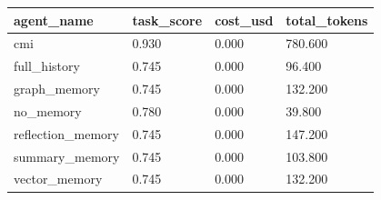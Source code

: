 \begin{tabular}{llll}
\toprule
agent\_name & task\_score & cost\_usd & total\_tokens \\
\midrule
cmi & 0.930 & 0.000 & 780.600 \\
full\_history & 0.745 & 0.000 & 96.400 \\
graph\_memory & 0.745 & 0.000 & 132.200 \\
no\_memory & 0.780 & 0.000 & 39.800 \\
reflection\_memory & 0.745 & 0.000 & 147.200 \\
summary\_memory & 0.745 & 0.000 & 103.800 \\
vector\_memory & 0.745 & 0.000 & 132.200 \\
\bottomrule
\end{tabular}
